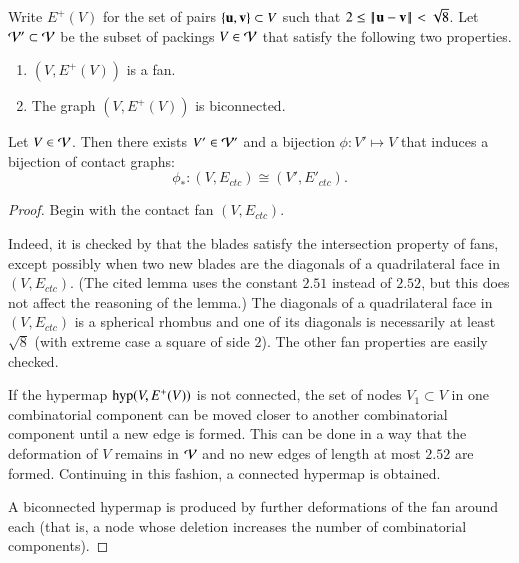 \documentclass{llncs}
\def\op#1{{\hbox{#1}}}
\begin{document}
\begin{definition}[$\CalV'$,~$E^+(V)$]
  Write
$E^+(V)$ for the set of pairs $\{{\mathbf u},{\mathbf v}\}\subset V$
  such that $2\le\norm{\u}{\v} <\sqrt8$.
Let ${\mathcal V}'\subset{\mathcal V}$ be the subset of packings $V\in{\mathcal V}$ that
satisfy the following two properties. 
\begin{enumerate}
\item  $(V,E^+(V))$ is a fan.
\item The graph $(V,E^+(V))$ is biconnected.
\end{enumerate}
\end{definition}
%
%



\begin{lemma}\label{lemma:V'-bi} 
Let $V\in {\mathcal V}$.  Then there exists $V'\in {\mathcal V}'$ and a bijection 
 $\phi:V'\mapsto V$ that induces a bijection
  of contact graphs:
\[
\phi_*:(V,E_{ctc}) \cong (V',E'_{ctc}).
\]
\end{lemma}


\begin{proof}
  Begin with the contact fan $(V,E_{ctc})$.  

   Indeed, it is checked by
  \cite[Lemma~4.30]{Hales:2006:DCG} that the blades satisfy the
  intersection property of fans, except possibly when two new blades
  are the diagonals of a quadrilateral face in $(V,E_{ctc})$.  (The
  cited lemma uses the constant $2.51$ instead of $2.52$, but this
  does not affect the reasoning of the lemma.)  The diagonals of a quadrilateral face
  in $(V,E_{ctc})$ is a spherical rhombus and one of its diagonals is
  necessarily at least $\sqrt8$ (with extreme case a square of side
  $2$).  The other fan properties are easily checked.

  If the hypermap $\op{hyp}(V,E^+(V))$ is not connected,
  the set of nodes $V_1\subset V$ in one combinatorial component can
  be moved closer to another combinatorial component until a new edge
  is formed.  This can be done in a way that the deformation of $V$
  remains in ${\mathcal V}$ and no new edges of length at most $2.52$ are formed.
  Continuing in this fashion, a connected hypermap is obtained.

A biconnected hypermap is produced by  further
 deformations of the fan around each   (that is, a node 
whose deletion increases the number of combinatorial components).
\end{proof}
\end{document}
